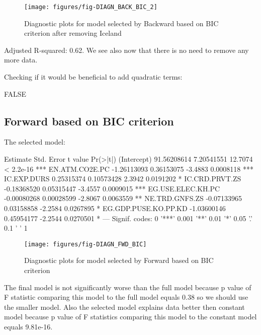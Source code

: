 \documentclass[a4paper]{article}
\begin{document}
\begin{figure}[H]
\begin{center}
\texttt{[image: figures/fig-DIAGN\_BACK\_BIC\_2]}
\caption{Diagnostic plots for model selected by Backward based on BIC criterion after removing Iceland}
\end{center}
\end{figure}
Adjusted R-squared:
0.62. We see also now
that there is no need to remove any more data.

Checking if it would be beneficial to add quadratic terms:
\begin{Schunk}
\begin{Soutput}
[1] FALSE
\end{Soutput}
\end{Schunk}

\subsection{Forward based on BIC criterion}
The selected model:
\begin{Schunk}
\begin{Soutput}
                        Estimate  Std. Error t value  Pr(>|t|)    
(Intercept)          91.56208614  7.20541551 12.7074 < 2.2e-16 ***
EN.ATM.CO2E.PC       -1.26113093  0.36153075 -3.4883 0.0008118 ***
IC.EXP.DURS           0.25315374  0.10573428  2.3942 0.0191202 *  
IC.CRD.PRVT.ZS       -0.18368520  0.05315447 -3.4557 0.0009015 ***
EG.USE.ELEC.KH.PC    -0.00080268  0.00028599 -2.8067 0.0063559 ** 
NE.TRD.GNFS.ZS       -0.07133965  0.03158858 -2.2584 0.0267895 *  
EG.GDP.PUSE.KO.PP.KD -1.03600146  0.45954177 -2.2544 0.0270501 *  
---
Signif. codes:  0 '***' 0.001 '**' 0.01 '*' 0.05 '.' 0.1 ' ' 1
\end{Soutput}
\end{Schunk}

\begin{figure}[H]
\begin{center}
\texttt{[image: figures/fig-DIAGN\_FWD\_BIC]}
\caption{Diagnostic plots for model selected by Forward based on BIC criterion}
\end{center}
\end{figure}

The final model is not significantly worse than
the full model because p value of F statistic comparing this model to the full
model equals
0.38 so we should use the smaller model. Also the selected model explains data better then constant model because p value of F statistics comparing this model to the
constant model equals 
9.81e-16.
\end{document}
